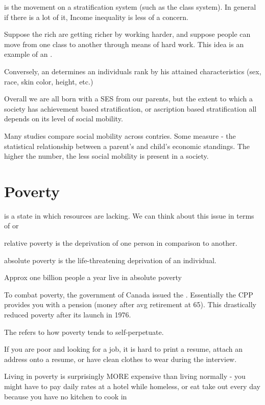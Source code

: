  is the movement on a stratification system (such as the class system). In general if there is a lot of it, Income inequality is less of a concern. 
\begin{bullets}
	\item Suppose the rich are getting richer by working harder, and suppose people can move from one class to another through means of hard work. This idea is an example of an .
	\item Conversely, an  determines an individuals rank by his attained characteristics (sex, race, skin color, height, etc.)
\end{bullets}

Overall we are all born with a SES from our parents, but the extent to which a society has achievement based stratification, or ascription based stratification all depends on its level of social mobility.

Many studies compare social mobility across contries. Some measure  - the statistical relationship between a parent's and child's economic standings. The higher the number, the less social mobility is present in a society.

\section{Poverty}

 is a state in which resources are lacking. We can think about this issue in terms of  or 
\begin{bullets}
	\item relative poverty is the deprivation of one person in comparison to another.
	\item absolute poverty is the life-threatening deprivation of an individual.
	\item Approx one billion people a year live in absolute poverty
\end{bullets}

To combat poverty, the government of Canada issued the . Essentially the CPP provides you with a pension (money after avg retirement at 65). This drastically reduced poverty after its launch in 1976.

The  refers to how poverty tends to self-perpetuate.
\begin{bullets}
	\item If you are poor and looking for a job, it is hard to print a resume, attach an address onto a resume, or have clean clothes to wear during the interview.
	\item Living in poverty is surprisingly MORE expensive than living normally - you might have to pay daily rates at a hotel while homeless, or eat take out every day because you have no kitchen to cook in
\end{bullets}

